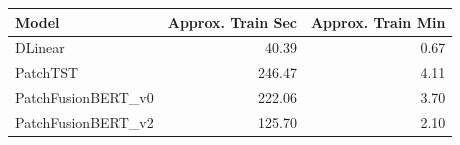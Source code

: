 \begin{tabular}{lrr}
\toprule
Model & Approx. Train Sec & Approx. Train Min \\
\midrule
DLinear & 40.39 & 0.67 \\
PatchTST & 246.47 & 4.11 \\
PatchFusionBERT\_v0 & 222.06 & 3.70 \\
PatchFusionBERT\_v2 & 125.70 & 2.10 \\
\bottomrule
\end{tabular}
